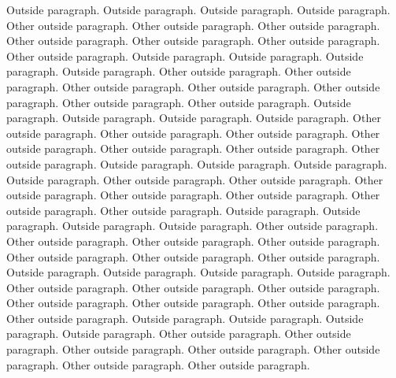\documentclass{scrartcl}
\begin{document}
\begin{pairs}
\begin{Rightside}
            \pend
                        \pstart
                Outside paragraph. Outside paragraph. Outside paragraph. Outside paragraph.
            \pend
            \pstart
                Other outside paragraph. Other outside paragraph. Other outside paragraph. Other outside paragraph. Other outside paragraph. Other outside paragraph. Other outside paragraph.
            \pend
                        \pstart
                Outside paragraph. Outside paragraph. Outside paragraph. Outside paragraph.
            \pend
            \pstart
                Other outside paragraph. Other outside paragraph. Other outside paragraph. Other outside paragraph. Other outside paragraph. Other outside paragraph. Other outside paragraph.
            \pend
                        \pstart
                Outside paragraph. Outside paragraph. Outside paragraph. Outside paragraph.
            \pend
            \pstart
                Other outside paragraph. Other outside paragraph. Other outside paragraph. Other outside paragraph. Other outside paragraph. Other outside paragraph. Other outside paragraph.
            \pend
                        \pstart
                Outside paragraph. Outside paragraph. Outside paragraph. Outside paragraph.
            \pend
            \pstart
                Other outside paragraph. Other outside paragraph. Other outside paragraph. Other outside paragraph. Other outside paragraph. Other outside paragraph. Other outside paragraph.
            \pend
                        \pstart
                Outside paragraph. Outside paragraph. Outside paragraph. Outside paragraph.
            \pend
            \pstart
                Other outside paragraph. Other outside paragraph. Other outside paragraph. Other outside paragraph. Other outside paragraph. Other outside paragraph. Other outside paragraph.
            \pend
                        \pstart
                Outside paragraph. Outside paragraph. Outside paragraph. Outside paragraph.
            \pend
            \pstart
                Other outside paragraph. Other outside paragraph. Other outside paragraph. Other outside paragraph. Other outside paragraph. Other outside paragraph. Other outside paragraph.
            \pend
                        \pstart
                Outside paragraph. Outside paragraph. Outside paragraph. Outside paragraph.
            \pend
            \pstart
                Other outside paragraph. Other outside paragraph. Other outside paragraph. Other outside paragraph. Other outside paragraph. Other outside paragraph. Other outside paragraph.
            \pend

\end{Rightside}
\end{pairs}
\end{document}
